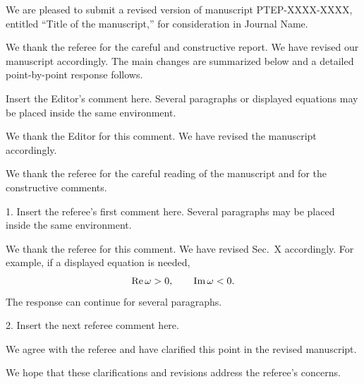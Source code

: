 \documentclass[11pt]{article}
\renewcommand{\manuscriptID}{PTEP-XXXX-XXXX}
\renewcommand{\Title}{Title of the manuscript}
\renewcommand{\Journal}{Journal Name}
\renewcommand{\Authors}{AUTHOR NAME(S)}
\begin{document}
\replydate
\replysalutation

We are pleased to submit a revised version of manuscript \manuscriptID,
entitled ``\Title,'' for consideration in \Journal.

We thank the referee for the careful and constructive report. We have revised
our manuscript accordingly. The main changes are summarized below and a
detailed point-by-point response follows.

\replyclosing{\Authors}

\newpage
\replytoeditor

\begin{editorcomment}
Insert the Editor's comment here. Several paragraphs or displayed equations
may be placed inside the same environment.
\end{editorcomment}

\begin{authorresponse}
We thank the Editor for this comment. We have revised the manuscript
accordingly.
\end{authorresponse}

\newpage
\replytoreferee

We thank the referee for the careful reading of the manuscript and for the
constructive comments.

\begin{refereecomment}
1. Insert the referee's first comment here. Several paragraphs may be placed
inside the same environment.
\end{refereecomment}

\begin{authorresponse}
We thank the referee for this comment. We have revised Sec.~X accordingly.
For example, if a displayed equation is needed,
\begin{equation}
  \operatorname{Re} \omega > 0,
  \qquad
  \operatorname{Im} \omega < 0.
\end{equation}
The response can continue for several paragraphs.
\end{authorresponse}

\begin{refereecomment}
2. Insert the next referee comment here.
\end{refereecomment}

\begin{authorresponse}
We agree with the referee and have clarified this point in the revised
manuscript.
\end{authorresponse}

We hope that these clarifications and revisions address the referee's concerns.
\end{document}
